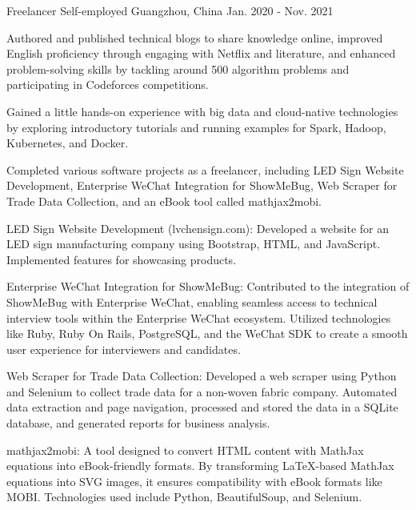 \begin{cventries}
\cventry
{Freelancer} %
{Self-employed} %
{Guangzhou, China} %
{Jan. 2020 - Nov. 2021} %
{
  \begin{cvitems} %
    \item {Authored and published technical blogs to share knowledge online, improved English proficiency through engaging with Netflix and literature, and enhanced problem-solving skills by tackling around 500 algorithm problems and participating in Codeforces competitions.}
    \item {Gained a little hands-on experience with big data and cloud-native technologies by exploring introductory tutorials and running examples for Spark, Hadoop, Kubernetes, and Docker.}
    \item {Completed various software projects as a freelancer, including LED Sign Website Development, Enterprise WeChat Integration for ShowMeBug, Web Scraper for Trade Data Collection, and an eBook tool called mathjax2mobi.}
    \item {LED Sign Website Development (lvchensign.com): Developed a website for an LED sign manufacturing company using Bootstrap, HTML, and JavaScript. Implemented features for showcasing products.}
    \item {Enterprise WeChat Integration for ShowMeBug: Contributed to the integration of ShowMeBug with Enterprise WeChat, enabling seamless access to technical interview tools within the Enterprise WeChat ecosystem. Utilized technologies like Ruby, Ruby On Rails, PostgreSQL, and the WeChat SDK to create a smooth user experience for interviewers and candidates.}
    \item {Web Scraper for Trade Data Collection: Developed a web scraper using Python and Selenium to collect trade data for a non-woven fabric company. Automated data extraction and page navigation, processed and stored the data in a SQLite database, and generated reports for business analysis.}
    \item {mathjax2mobi: A tool designed to convert HTML content with MathJax equations into eBook-friendly formats. By transforming LaTeX-based MathJax equations into SVG images, it ensures compatibility with eBook formats like MOBI. Technologies used include Python, BeautifulSoup, and Selenium.}
  \end{cvitems}
}


\end{cventries}
